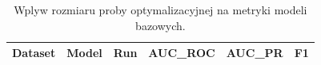 \begin{table}
\caption{Wplyw rozmiaru proby optymalizacyjnej na metryki modeli bazowych.}
\label{tab:baselines_by_run}
\begin{tabular}{llrrrr}
\toprule
Dataset & Model & Run & AUC_ROC & AUC_PR & F1 \\
\midrule
\bottomrule
\end{tabular}
\end{table}
